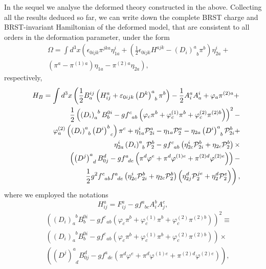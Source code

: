 \documentclass[a4paper,12pt]{article}
\begin{document}
In the sequel we analyse the deformed theory constructed in the above.
Collecting all the results deduced so far, we can write down the complete
BRST charge and BRST-invariant Hamiltonian of the deformed model, that are
consistent to all orders in the deformation parameter, under the form 
\begin{eqnarray}
&&\Omega =\int d^{3}x\left( \epsilon _{0ijk}\pi ^{jka}\eta _{1a}^{i}+\left( 
\frac{1}{2}\epsilon _{0ijk}H^{ajk}-\left( D_{i}\right) _{\;\;b}^{a}\pi
^{b}\right) \eta _{2a}^{i}+\right.  \nonumber \\
&&\left. \left( \pi ^{a}-\pi ^{(1)a}\right) \eta _{1a}-\pi ^{(2)a}\eta
_{2a}\right) ,  \label{47x}
\end{eqnarray}
respectively, 
\begin{eqnarray}
& &H_{B}=\int d^{3}x\left( \frac{1}{2}B_{a}^{ij}\left( H_{ij}^{a}+
\varepsilon _{0ijk}\left( D^{k}\right) _{\;\;b}^{a}\pi ^{b}\right) -\frac{1}{%
2}A_{i}^{a}A_{a}^{i}+\varphi _{a}\pi ^{(2)a}+\right.  \nonumber \\
& &\frac{1}{2}\left( \left( D_{i}\right)
_{a}^{\;\;b}B_{b}^{0i}-gf_{\;\;ab}^{c}\left( \varphi _{c}\pi ^{b}+\varphi
_{c}^{(1)}\pi ^{b}+\varphi _{c}^{(2)}\pi ^{(2)b}\right) \right) ^{2}- 
\nonumber \\
& &\varphi _{a}^{(2)}\left( \left( D_{i}\right) _{\;\;b}^{a} \left(
D^{i}\right) _{\;\;c}^{b}\right) \pi ^{c}+\eta _{1a}^{i}\mathcal{P}%
_{2i}^{a}-\eta _{1a}\mathcal{P}_{2}^{a}-\eta _{2a}\left( D^{i}\right)
_{\;\;b}^{a}\mathcal{P}_{2i}^{b}+  \nonumber \\
& &\eta _{2a}^{i}\left( D_{i}\right) _{\;\;b}^{a}\mathcal{P}_{2}^{b}-
gf_{\;\;ab}^{c}\left( \eta _{2c}^{i}\mathcal{P}_{2i}^{b}+\eta _{2c}\mathcal{P%
}_{2}^{b}\right) \times  \nonumber \\
& &\left( \left( D^{j}\right) _{\;\;d}^{a}B_{0j}^{d}- gf_{\;\;de}^{a}\left(
\pi ^{d}\varphi ^{e}+\pi ^{d}\varphi ^{(1)e}+\pi ^{(2)d}\varphi
^{(2)e}\right) \right) -  \nonumber \\
& &\left. \frac{1}{2}g^{2}f_{\;\;ab}^{c}f_{\;\;de}^{a}\left( \eta _{2c}^{i}%
\mathcal{P}_{2i}^{b}+\eta _{2c}\mathcal{P}_{2}^{b}\right) \left( \eta
_{2j}^{d}\mathcal{P}_{2}^{je}+\eta _{2}^{d}\mathcal{P}_{2}^{e}\right)
\right) ,  \label{48x}
\end{eqnarray}
where we employed the notations 
\begin{equation}
H_{ij}^{a}=F_{ij}^{a}-gf_{\;\;bc}^{a}A_{i}^{b}A_{j}^{c},  \label{49x}
\end{equation}
\begin{eqnarray}
&&\left( \left( D_{i}\right) _{a}^{\;\;b}B_{b}^{0i}-gf_{\;\;ab}^{c}\left(
\varphi _{c}\pi ^{b}+\varphi _{c}^{(1)}\pi ^{b}+\varphi _{c}^{(2)}\pi
^{(2)b}\right) \right) ^{2}\equiv  \nonumber \\
&&\left( \left( D_{i}\right) _{a}^{\;\;b}B_{b}^{0i}-gf_{\;\;ab}^{c}\left(
\varphi _{c}\pi ^{b}+\varphi _{c}^{(1)}\pi ^{b}+\varphi _{c}^{(2)}\pi
^{(2)b}\right) \right) \times  \nonumber \\
&&\left( \left( D^{j}\right) _{\;\;d}^{a}B_{0j}^{d}-gf_{\;\;de}^{a}\left(
\pi ^{d}\varphi ^{e}+\pi ^{d}\varphi ^{(1)e}+\pi ^{(2)d}\varphi
^{(2)e}\right) \right) ,  \label{50x}
\end{eqnarray}
\end{document}
